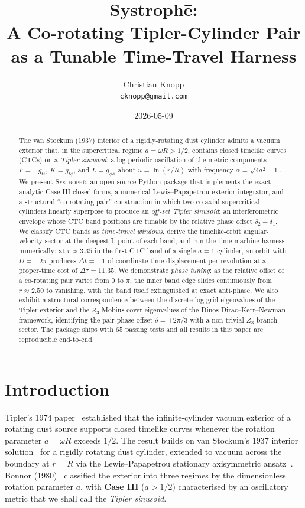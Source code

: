 \documentclass[11pt,a4paper]{article}
\title{\bfseries Systroph\=e: \\
A Co-rotating Tipler-Cylinder Pair as a Tunable Time-Travel Harness}
\author{Christian Knopp\\\texttt{cknopp@gmail.com}}
\date{2026-05-09}
\begin{document}
\maketitle

\begin{abstract}
The van Stockum (1937) interior of a rigidly-rotating dust cylinder
admits a vacuum exterior that, in the supercritical regime
$a = \omega R > 1/2$, contains closed timelike curves (CTCs) on a
\emph{Tipler sinusoid}: a log-periodic oscillation of the metric
components $F = -g_{tt}$, $K = g_{t\phi}$, and $L = g_{\phi\phi}$ about
$u = \ln(r/R)$ with frequency $\alpha = \sqrt{4 a^2 - 1}$. We present
\textsc{Systroph\=e}, an open-source Python package that implements the
exact analytic Case III closed forms, a numerical Lewis--Papapetrou
exterior integrator, and a structural ``co-rotating pair'' construction
in which two co-axial supercritical cylinders linearly superpose to
produce an \emph{off-set Tipler sinusoid}: an interferometric envelope
whose CTC band positions are tunable by the relative phase offset
$\delta_2 - \delta_1$. We classify CTC bands as \emph{time-travel
windows}, derive the timelike-orbit angular-velocity sector at the
deepest L-point of each band, and run the time-machine harness
numerically: at $r \approx 3.35$ in the first CTC band of a single
$a = 1$ cylinder, an orbit with $\Omega = -2\pi$ produces
$\Delta t = -1$ of coordinate-time displacement per revolution at a
proper-time cost of $\Delta\tau = 11.35$. We demonstrate \emph{phase
tuning}: as the relative offset of a co-rotating pair varies from $0$
to $\pi$, the inner band edge slides continuously from
$r \approx 2.50$ to vanishing, with the band itself extinguished at
exact anti-phase. We also exhibit a structural correspondence between
the discrete log-grid eigenvalues of the Tipler exterior and the
$Z_3$ M{\"o}bius cover eigenvalues of the \=Dinos
Dirac--Kerr--Newman framework, identifying the pair phase offset
$\delta = \pm 2\pi/3$ with a non-trivial $Z_3$ branch sector. The
package ships with $65$ passing tests and all results in this paper
are reproducible end-to-end.
\end{abstract}

\section{Introduction}

Tipler's 1974 paper~\cite{Tipler1974} established that the
infinite-cylinder vacuum exterior of a rotating dust source supports
closed timelike curves whenever the rotation parameter
$a = \omega R$ exceeds $1/2$. The result builds on van Stockum's
1937 interior solution~\cite{vanStockum1937} for a rigidly rotating
dust cylinder, extended to vacuum across the boundary at $r = R$ via
the Lewis--Papapetrou stationary axisymmetric ansatz~\cite{Lewis1932}.
Bonnor (1980)~\cite{Bonnor1980} classified the exterior into three
regimes by the dimensionless rotation parameter $a$, with
\textbf{Case III} ($a > 1/2$) characterised by an oscillatory metric
that we shall call the \emph{Tipler sinusoid}.
\end{document}
